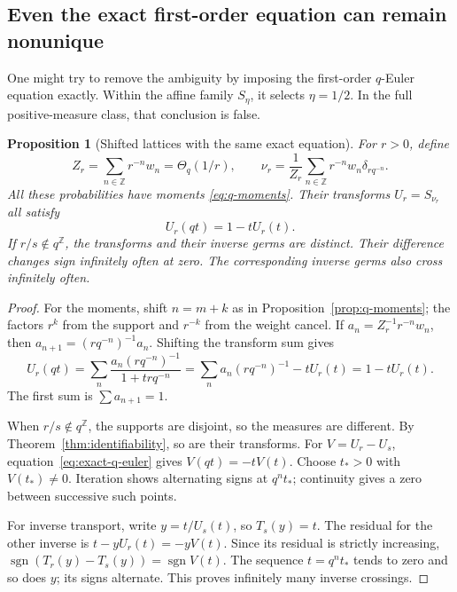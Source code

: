 \documentclass[11pt,a4paper]{article}
\numberwithin{equation}{section}
\newtheorem{proposition}[theorem]{Proposition}
\theoremstyle{definition}
\theoremstyle{remark}
\newcommand{\Z}{\mathbb Z}
\begin{document}
\subsection{Even the exact first-order equation can remain nonunique}
\label{subsec:shifted}
One might try to remove the ambiguity by imposing the first-order
\(q\)-Euler equation exactly. Within the affine family \(S_\eta\), it
selects \(\eta=1/2\). In the full positive-measure class, that conclusion
is false.

\begin{proposition}[Shifted lattices with the same exact equation]
\label{prop:shifted}
For \(r>0\), define
\begin{equation}
 Z_r=\sum_{n\in\Z}r^{-n}w_n=\Theta_q(1/r),\qquad
 \nu_r=\frac1{Z_r}\sum_{n\in\Z}r^{-n}w_n\delta_{r q^{-n}}.
 \label{eq:shifted-lattice}
\end{equation}
All these probabilities have moments \eqref{eq:q-moments}. Their
transforms \(U_r=S_{\nu_r}\) all satisfy
\begin{equation}
 U_r(qt)=1-tU_r(t).
 \label{eq:exact-q-euler}
\end{equation}
If \(r/s\notin q^\Z\), the transforms and their inverse germs are
distinct. Their difference changes sign infinitely often at zero.
The corresponding inverse germs also cross infinitely often.
\end{proposition}
\begin{proof}
For the moments, shift \(n=m+k\) as in
Proposition~\ref{prop:q-moments}; the factors \(r^k\) from the support
and \(r^{-k}\) from the weight cancel. If
\(a_n=Z_r^{-1}r^{-n}w_n\), then
\(a_{n+1}=(rq^{-n})^{-1}a_n\). Shifting the transform sum gives
\[
 U_r(qt)=\sum_n\frac{a_n(rq^{-n})^{-1}}{1+trq^{-n}}
        =\sum_na_n(rq^{-n})^{-1}-tU_r(t)=1-tU_r(t).
\]
The first sum is \(\sum a_{n+1}=1\).

When \(r/s\notin q^\Z\), the supports are disjoint, so the measures
are different. By Theorem~\ref{thm:identifiability}, so are their
transforms. For \(V=U_r-U_s\), equation~\eqref{eq:exact-q-euler} gives
\(V(qt)=-tV(t)\). Choose \(t_*>0\) with \(V(t_*)\ne0\). Iteration
shows alternating signs at \(q^nt_*\); continuity gives a zero between
successive such points.

For inverse transport, write \(y=t/U_s(t)\), so \(T_s(y)=t\).
The residual for the other inverse is
\(t-yU_r(t)=-yV(t)\). Since its residual is strictly increasing,
\(\operatorname{sgn}(T_r(y)-T_s(y))=\operatorname{sgn}V(t)\).
The sequence \(t=q^nt_*\) tends to zero and so does \(y\); its signs
alternate. This proves infinitely many inverse crossings.
\end{proof}
\end{document}
